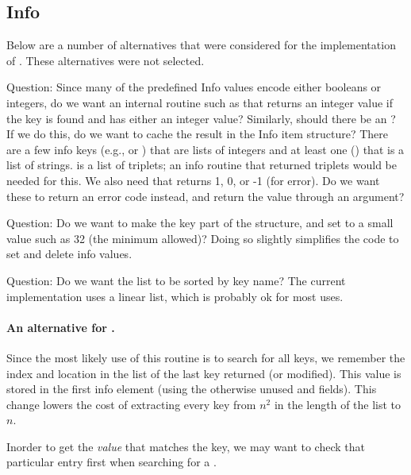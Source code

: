 \documentclass{article}
\begin{document}
\subsection{Info}

Below are a number of alternatives that were considered for the
implementation of .  These alternatives were not
selected.

Question: Since many of the predefined Info values encode either booleans or
integers, do we want an internal routine such as 
that returns an integer value if the key is found and has either an integer
value?  Similarly, should there be an ?
If we do this, do we want to cache the result in the Info item
structure?
There are a few info keys (e.g.,  or
) that are lists of integers and at least one
() that is a list of strings.  
is a list of triplets; an info routine that returned triplets would be
needed for this.
We also need  that returns 1, 0, or -1
(for error).  
Do we want these to return an error code instead, and return the value
through an argument?

Question: Do we want to make the key part of the structure, and set
 to a small value such as 32 (the minimum
allowed)?  Doing so slightly simplifies the code to set and delete info
values. 

Question: Do we want the list to be sorted by key name?  The current
implementation uses a linear list, which is probably ok for most uses.

\paragraph{An alternative for .}

Since the most likely use of this routine is to search for all keys,
we remember the index and location in the list of the last key
returned (or modified).  This value is stored in the 
first info element (using the otherwise unused  and
 fields).  This change lowers the cost of extracting every 
key from $n^2$ in the length of the list to $n$.  

Inorder to get the
\emph{value} that matches the key, we may want to check that
particular entry first when searching for a .
\end{document}
